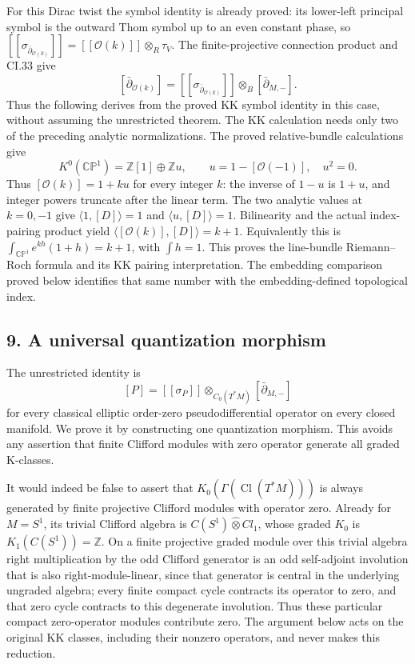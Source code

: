 \documentclass[
  11pt,
]{article}
\begin{document}
For this Dirac twist the symbol identity is already proved: its
lower-left principal symbol is the outward Thom symbol up to an even
constant phase, so
\([\![\sigma_{\bar\partial_{\mathcal O(k)}}]\!]=[\![\mathcal O(k)]\!]\otimes_R\tau_V\).
The finite-projective connection product and CI.33 give \[
 [\bar\partial_{\mathcal O(k)}]
 =[\![\sigma_{\bar\partial_{\mathcal O(k)}}]\!]\otimes_B
                                    [\bar\partial_{M,-}].
\] Thus the following derives from the proved KK symbol identity in this
case, without assuming the unrestricted theorem. The KK calculation
needs only two of the preceding analytic normalizations. The proved
relative-bundle calculations give \[
 K^0(\mathbb {CP}^1)=\mathbb Z[1]\oplus\mathbb Zu,\qquad
 u=1-[\mathcal O(-1)],\quad u^2=0.
\] Thus \([\mathcal O(k)]=1+ku\) for every integer \(k\): the inverse of
\(1-u\) is \(1+u\), and integer powers truncate after the linear term.
The two analytic values at \(k=0,-1\) give \(\langle1,[D]\rangle=1\) and
\(\langle u,[D]\rangle=1\). Bilinearity and the actual index-pairing
product yield \(\langle[\mathcal O(k)],[D]\rangle=k+1\). Equivalently
this is \(\int_{\mathbb {CP}^1}e^{kh}(1+h)=k+1\), with \(\int h=1\).
This proves the line-bundle Riemann--Roch formula and its KK pairing
interpretation. The embedding comparison proved below identifies that
same number with the embedding-defined topological index.

\subsection{9. A universal quantization
morphism}\label{a-universal-quantization-morphism}

The unrestricted identity is \[
 [P]=[\![\sigma_P]\!]\otimes_{C_0(T^*M)}
                    [\bar\partial_{M,-}]
 \tag{CI.42}
\] for every classical elliptic order-zero pseudodifferential operator
on every closed manifold. We prove it by constructing one quantization
morphism. This avoids any assertion that finite Clifford modules with
zero operator generate all graded K-classes.

It would indeed be false to assert that
\(K_0(\Gamma(\operatorname{Cl}(T^*M)))\) is always generated by finite
projective Clifford modules with operator zero. Already for \(M=S^1\),
its trivial Clifford algebra is \(C(S^1)\widehat\otimes Cl_1\), whose
graded \(K_0\) is \(K_1(C(S^1))=\mathbb Z\). On a finite projective
graded module over this trivial algebra right multiplication by the odd
Clifford generator is an odd self-adjoint involution that is also
right-module-linear, since that generator is central in the underlying
ungraded algebra; every finite compact cycle contracts its operator to
zero, and that zero cycle contracts to this degenerate involution. Thus
these particular compact zero-operator modules contribute zero. The
argument below acts on the original KK classes, including their nonzero
operators, and never makes this reduction.
\end{document}

